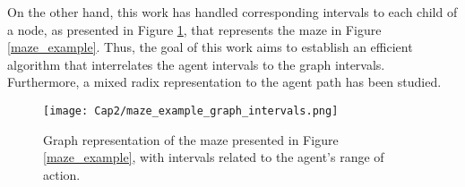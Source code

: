 On the other hand, this work has handled corresponding intervals to each child of a node, as presented in Figure \ref{maze_example_graph_intervals}, that represents the maze in Figure \ref{maze_example}. Thus, the goal of this work aims to establish an efficient algorithm that interrelates the agent intervals to the graph intervals. Furthermore, a mixed radix representation to the agent path has been studied.

\begin{figure}[ht!]
\centering
\texttt{[image: Cap2/maze\_example\_graph\_intervals.png]}
\caption{Graph representation of the maze presented in Figure \ref{maze_example}, with intervals related to the agent's range of action.}
\label{maze_example_graph_intervals}
\end{figure}	